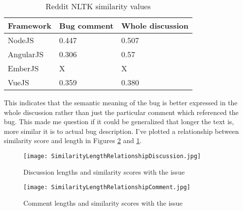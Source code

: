 \begin{table}[H]
\centering
\begin{tabular}{ |p{3cm}||p{3cm}|p{4cm}|}
 \hline
\textbf{ Framework }& \textbf{Bug comment}& \textbf{Whole discussion}\\
 \hline
 NodeJS   & 0.447 & 0.507\\ \hline 
 AngularJS & 0.306 & 0.57 \\ \hline 
 EmberJS & X & X\\ \hline
 VueJS &   0.359 & 0.380\\ \hline
\end{tabular}
\caption{Reddit NLTK similarity values}
\label{table:RedditNLTKsimilarity}
\end{table}

This indicates that the semantic meaning of the bug is better expressed in the whole discussion rather than just the particular comment which referenced the bug. This made me question if it could be generalized that longer the text is, more similar it is to actual bug description. I've plotted a relationship between similarity score and length in Figures \ref{fig:SimilarityLengthRelationshipComment} and \ref{fig:SimilarityLengthRelationshipDiscussion}.

\begin{figure}[H]%
    \centering
	\texttt{[image: SimilarityLengthRelationshipDiscussion.jpg]}
    \caption{Discussion lengths and similarity scores with the issue}%
    \label{fig:SimilarityLengthRelationshipDiscussion}%
\end{figure}

\begin{figure}[H]%
    \centering
	\texttt{[image: SimilarityLengthRelationshipComment.jpg]}
    \caption{Comment lengths and similarity scores with the issue}%
    \label{fig:SimilarityLengthRelationshipComment}%
\end{figure}


